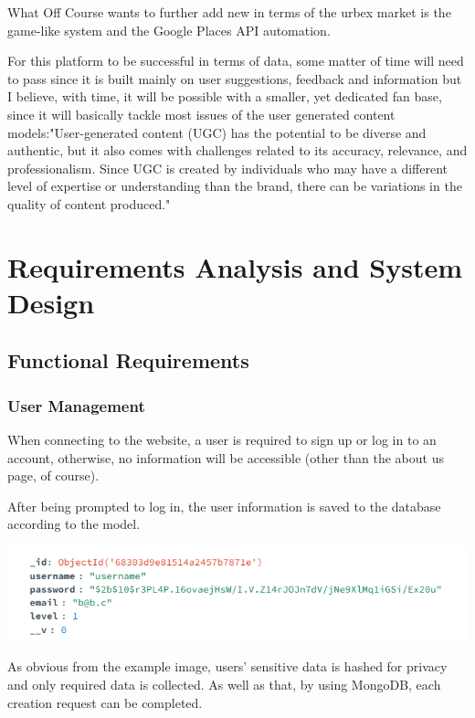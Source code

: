 \documentclass[12pt,a4paper]{report}
\begin{document}
What Off Course wants to further add new in terms of the urbex market is the game-like system and the Google Places API automation.

For this platform to be successful in terms of data, some matter of time will need to pass since it is built mainly on user suggestions, feedback and information but I believe, with time, it will be possible with a smaller, yet dedicated fan base, since it will basically tackle most issues of the user generated content models:"User-generated content (UGC) has the potential to be diverse and authentic, but it also comes with challenges related to its accuracy, relevance, and professionalism. Since UGC is created by individuals who may have a different level of expertise or understanding than the brand, there can be variations in the quality of content produced."~\cite{ugcChallenges}


\chapter{Requirements Analysis and System Design}
\section{Functional Requirements}
\subsection{User Management}
When connecting to the website, a user is required to sign up or log in to an account, otherwise, no information will be accessible (other than the about us page, of course).

After being prompted to log in, the user information is saved to the database according to the model. 

\begin{center}
\includegraphics[width=1\textwidth]{images/user db.png}
\end{center}

As obvious from the example image, users' sensitive data is hashed for privacy and only required data is collected. As well as that, by using MongoDB, each creation request can be completed.
\end{document}
